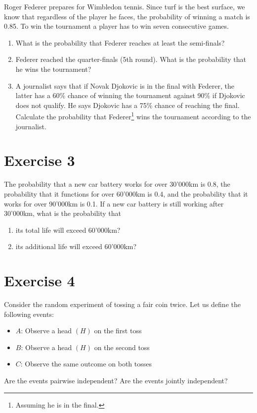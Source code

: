 \documentclass[12pt,thmsa]{article}\usepackage[]{graphicx}\usepackage[]{color}
\begin{document}
Roger Federer prepares for Wimbledon tennis. Since turf is the best surface, we know that regardless of the player he faces, the probability of winning a match is 0.85. To win the tournament a player has to win seven consecutive games.

\begin{enumerate} %

\item What is the probability that Federer reaches at least the semi-finals?

\item Federer reached the quarter-finals (5th round). What is the probability that he wins the tournament?

\item A journalist says that if Novak Djokovic is in the final with Federer, the latter has a 60\% chance of winning the tournament against 90\% if Djokovic does not qualify.
 He says Djokovic has a 75\% chance of reaching the final. Calculate the probability that Federer\footnote{Assuming he is in the final.} wins the tournament according to the  journalist.

\end{enumerate}

\section*{Exercise 3}

The probability that a new car battery works for over  30'000km is
0.8, the probability that it functions for over 60'000km is 0.4, and the probability that it
works for over 90'000km is 0.1. If a new car battery is still working after 30'000km,
what is the probability that

\begin{enumerate}
\item  its total life will exceed 60'000km?
\item its additional life will exceed 60'000km?

\end{enumerate}


\section*{Exercise 4}
Consider the random experiment of tossing a fair coin twice. Let us define the following events:
\begin{itemize}
\item $ A $: Observe a head $ (H) $ on the first toss
\item $ B $: Observe a head $ (H) $ on the second toss
\item $ C $: Observe the same outcome on both tosses
\end{itemize}
Are the events pairwise independent? Are the events jointly independent?
\end{document}
